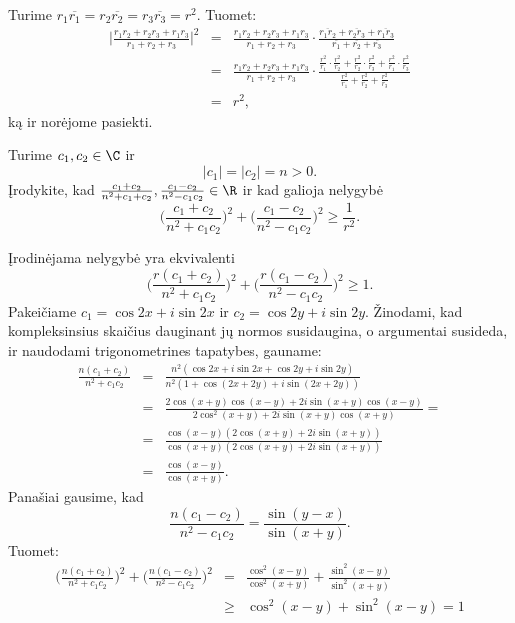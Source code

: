 \begin{sprendimas}
Turime $r_1\overline{r_1}=r_2\overline{r_2}=r_3\overline{r_3}=r^2.$ Tuomet: \begin{eqnarray*} 
\Bigg\vert\frac{r_1r_2+r_2r_3+r_1r_3}{r_1+r_2+r_3}\Bigg\vert ^2&=&\frac{r_1r_2+r_2r_3+r_1r_3}{r_1+r_2+r_3}\cdot\frac{\overline{r_1r_2}+\overline{r_2r_3}+\overline{r_1r_3}}{\overline{r_1}+\overline{r_2}+\overline{r_3}}\\
&=&\frac{r_1r_2+r_2r_3+r_1r_3}{r_1+r_2+r_3}\cdot \frac{\frac{r^2}{r_1}\cdot\frac{r^2}{r_2}+\frac{r^2}{r_2}\cdot\frac{r^2}{r_3}+\frac{r^2}{r_1}\cdot\frac{r^2}{r_3}}{\frac{r^2}{r_1}+\frac{r^2}{r_2}+\frac{r^2}{r_3}}\\
&=&r^2,\end{eqnarray*} ką ir norėjome pasiekti.
\end{sprendimas}

\begin{pavnr}
Turime $c_1,c_2\in\C$ ir $$|c_1|=|c_2|=n>0.$$ Įrodykite, kad $\frac{c_1+c_2}{n^2+c_1+c_2}, \frac{c_1-c_2}{n^2-c_1c_2}\in \R$ ir kad galioja nelygybė $$\Bigg(\frac{c_1+c_2}{n^2+c_1c_2}\Bigg)^2+\Bigg(\frac{c_1-c_2}{n^2-c_1c_2}\Bigg)^2\geq\frac{1}{r^2}.$$ 
\end{pavnr}

\begin{sprendimas}
Įrodinėjama nelygybė yra ekvivalenti $$\Bigg(\frac{r(c_1+c_2)}{n^2+c_1c_2}\Bigg)^2+\Bigg(\frac{r(c_1-c_2)}{n^2-c_1c_2}\Bigg)^2\geq 1.$$ Pakeičiame $c_1=\cos 2x+i\sin 2x$ ir $c_2=\cos 2y+i\sin 2y$. Žinodami, kad kompleksinsius skaičius dauginant jų normos susidaugina, o argumentai susideda, ir naudodami trigonometrines tapatybes, gauname: \begin{eqnarray*}
\frac{n(c_1+c_2)}{n^2+c_1c_2}&=&\frac{n^2(\cos 2x+i\sin 2x+\cos 2y+i\sin 2y)}{n^2(1+\cos(2x+2y)+i\sin(2x+2y))}\\
&=&\frac{2\cos(x+y)\cos(x-y)+2i\sin(x+y)\cos(x-y)}{2\cos ^2(x+y)+2i\sin(x+y)\cos(x+y)}=\\
&=&\frac{\cos(x-y)\left(2\cos(x+y)+2i\sin(x+y)\right)}{\cos(x+y)\left(2\cos(x+y)+2i\sin(x+y)\right)}\\
&=&\frac{\cos (x-y)}{\cos(x+y)}.
\end{eqnarray*}
Panašiai gausime, kad $$\frac{n(c_1-c_2)}{n^2-c_1c_2}=\frac{\sin(y-x)}{\sin(x+y)}.$$ Tuomet: \begin{eqnarray*}
\Bigg(\frac{n(c_1+c_2)}{n^2+c_1c_2}\Bigg)^2+\Bigg(\frac{n(c_1-c_2)}{n^2-c_1c_2}\Bigg)^2&=&\frac{\cos ^2(x-y)}{\cos ^2(x+y)}+\frac{\sin ^2(x-y)}{\sin ^2 (x+y)}\\
&\geq & \cos ^2(x-y)+\sin ^2(x-y)=1
\end{eqnarray*}
\end{sprendimas}

